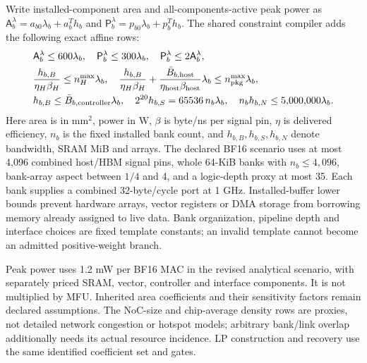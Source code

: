 Write installed-component area and all-components-active peak power as $\mathsf A_b^\lambda=a_{b0}\lambda_b+a_b^Th_b$ and $\mathsf P_b^\lambda=p_{b0}\lambda_b+p_b^Th_b$.
The shared constraint compiler adds the following exact affine rows:
\begin{align}
 &\mathsf A_b^\lambda\le600\lambda_b,
 \quad\mathsf P_b^\lambda\le300\lambda_b,
 \quad\mathsf P_b^\lambda\le2\mathsf A_b^\lambda,\nonumber\\
 &\frac{h_{b,B}}{\eta_H\beta_H}\le n_H^{\max}\lambda_b,
 \quad\frac{h_{b,B}}{\eta_H\beta_H}
       +\frac{\bar B_{b,\rm host}}{\eta_{\rm host}\beta_{\rm host}}\lambda_b
       \le n_{\rm pkg}^{\max}\lambda_b,\nonumber\\
 &h_{b,B}\le\bar B_{b,\rm controller}\lambda_b,
 \quad 2^{20}h_{b,S}=65536\,n_b\lambda_b,
 \quad n_bh_{b,N}\le5{,}000{,}000\lambda_b .
 \label{eq:physical_budget_rows}
\end{align}
Here area is in $\mathrm{mm}^2$, power in W, $\beta$ is byte/ns per signal pin, $\eta$ is delivered efficiency, $n_b$ is the fixed installed bank count, and $h_{b,B},h_{b,S},h_{b,N}$ denote bandwidth, SRAM MiB and arrays.
The declared BF16 scenario uses at most 4,096 combined host/HBM signal pins, whole 64-KiB banks with $n_b\le4{,}096$, bank-array aspect between $1/4$ and 4, and a logic-depth proxy at most 35.
Each bank supplies a combined 32-byte/cycle port at 1 GHz.
Installed-buffer lower bounds prevent hardware arrays, vector registers or DMA storage from borrowing memory already assigned to live data.
Bank organization, pipeline depth and interface choices are fixed template constants; an invalid template cannot become an admitted positive-weight branch.

Peak power uses 1.2 mW per BF16 MAC in the revised analytical scenario, with separately priced SRAM, vector, controller and interface components.
It is not multiplied by MFU.
Inherited area coefficients and their sensitivity factors remain declared assumptions.
The NoC-size and chip-average density rows are proxies, not detailed network congestion or hotspot models; arbitrary bank/link overlap additionally needs its actual resource incidence.
LP construction and recovery use the same identified coefficient set and gates.

